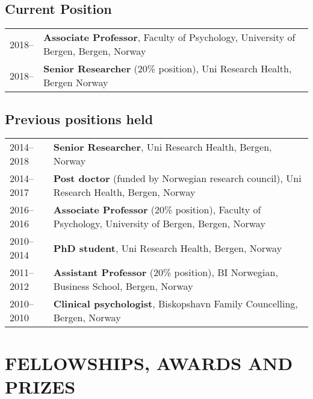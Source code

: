 \documentclass[11pt,a4paper,a4paper]{article}
\begin{document}
\hypertarget{current-position}{%
\subsection{Current Position}\label{current-position}}

\begin{tabular}{ll}
  2018-- & \textbf{Associate Professor}, Faculty of Psychology, University of Bergen, Bergen, Norway \\ 
  2018-- & \textbf{Senior Researcher} (20\% position), Uni Research Health, Bergen Norway \\ 
  \end{tabular}

\hypertarget{previous-positions-held}{%
\subsection{Previous positions held}\label{previous-positions-held}}

\begin{tabular}{ll}
  2014--2018 & \textbf{Senior Researcher}, Uni Research Health, Bergen, Norway \\ 
  2014--2017 & \textbf{Post doctor} (funded by Norwegian research council), Uni Research Health, Bergen, Norway \\ 
  2016--2016 & \textbf{Associate Professor}  (20\% position), Faculty of Psychology, University of Bergen, Bergen, Norway \\ 
  2010--2014 & \textbf{PhD student}, Uni Research Health, Bergen, Norway \\ 
  2011--2012 & \textbf{Assistant Professor} (20\% position), BI Norwegian, Business School, Bergen, Norway \\ 
  2010--2010 & \textbf{Clinical psychologist}, Biskopshavn Family Councelling, Bergen, Norway \\ 
  \end{tabular}

\hypertarget{fellowships-awards-and-prizes}{%
\section{FELLOWSHIPS, AWARDS AND PRIZES}\label{fellowships-awards-and-prizes}}
\end{document}
